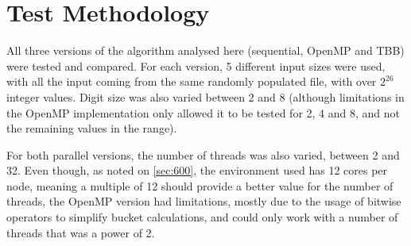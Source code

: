 \section{Test Methodology}
\label{sec:700}

All three versions of the algorithm analysed here (sequential, OpenMP and TBB) were tested and compared. For each version, 5 different input sizes were used, with all the input coming from the same randomly populated file, with over $2^{26}$ integer values. Digit size was also varied between 2 and 8 (although limitations in the OpenMP implementation only allowed it to be tested for 2, 4 and 8, and not the remaining values in the range).

For both parallel versions, the number of threads was also varied, between 2 and 32. Even though, as noted on \cref{sec:600}, the environment used has 12 cores per node, meaning a multiple of 12 should provide a better value for the number of threads, the OpenMP version had limitations, mostly due to the usage of bitwise operators to simplify bucket calculations, and could only work with a number of threads that was a power of 2.